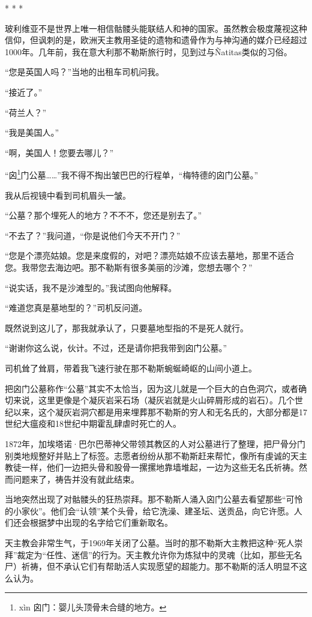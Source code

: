\documentclass[12pt,oneside]{book}
\begin{document}
\begin{center}
* * *
\end{center}

玻利维亚不是世界上唯一相信骷髅头能联结人和神的国家。虽然教会极度蔑视这种信仰，但讽刺的是，欧洲天主教用圣徒的遗物和遗骨作为与神沟通的媒介已经超过1000年。几年前，我在意大利那不勒斯旅行时，见到过与Ñatitas类似的习俗。

“您是英国人吗？”当地的出租车司机问我。

“接近了。”

“荷兰人？”

“我是美国人。”

“啊，美国人！您要去哪儿？”

“囟\footnote{xìn 囟门：婴儿头顶骨未合缝的地方。}门公墓……”我不得不掏出皱巴巴的行程单，“梅特德的囟门公墓。”

我从后视镜中看到司机眉头一皱。

“公墓？那个埋死人的地方？不不不，您还是别去了。”

“不去了？”我问道，“你是说他们今天不开门？”

“您是个漂亮姑娘。您是来度假的，对吧？漂亮姑娘不应该去墓地，那里不适合您。我带您去海边吧。那不勒斯有很多美丽的沙滩，您想去哪个？”

“说实话，我不是沙滩型的。”我试图向他解释。

“难道您真是墓地型的？”司机反问道。

既然说到这儿了，那我就承认了，只要墓地型指的不是死人就行。

“谢谢你这么说，伙计。不过，还是请你把我带到囟门公墓。”

司机耸了耸肩，带着我飞速行驶在那不勒斯蜿蜒崎岖的山间小道上。

把囟门公墓称作“公墓”其实不太恰当，因为这儿就是一个巨大的白色洞穴，或者确切来说，这里更像是个凝灰岩采石场（凝灰岩就是火山碎屑形成的岩石）。几个世纪以来，这个凝灰岩洞穴都是用来埋葬那不勒斯的穷人和无名氏的，大部分都是17世纪大瘟疫和18世纪中期霍乱肆虐时死亡的人。

1872年，加埃塔诺·巴尔巴蒂神父带领其教区的人对公墓进行了整理，把尸骨分门别类地规整好并贴上了标签。志愿者纷纷从那不勒斯赶来帮忙，像所有虔诚的天主教徒一样，他们一边把头骨和股骨一摞摞地靠墙堆起，一边为这些无名氏祈祷。然而问题来了，祷告并没有就此结束。

当地突然出现了对骷髅头的狂热崇拜。那不勒斯人涌入囟门公墓去看望那些“可怜的小家伙”。他们会“认领”某个头骨，给它洗澡、建圣坛、送贡品，向它许愿。人们还会根据梦中出现的名字给它们重新取名。

天主教会非常生气，于1969年关闭了公墓。当时的那不勒斯大主教把这种“死人崇拜”裁定为“任性、迷信”的行为。天主教允许你为炼狱中的灵魂（比如，那些无名尸）祈祷，但不承认它们有帮助活人实现愿望的超能力。那不勒斯的活人明显不这么认为。
\end{document}
